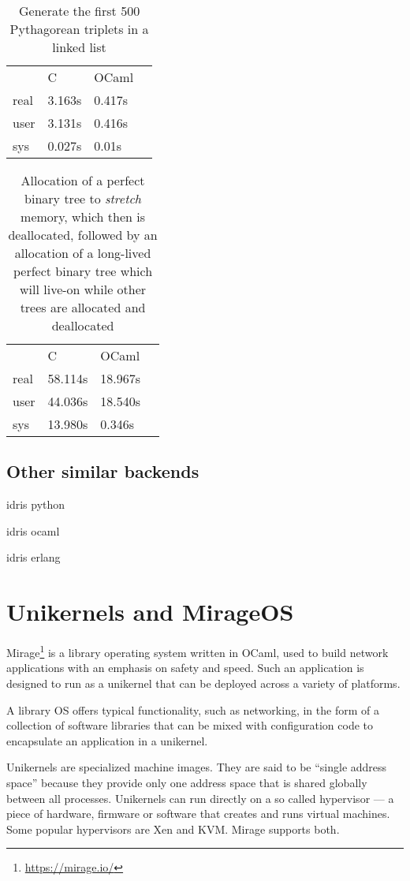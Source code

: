 \begin{table}
    \centering
    \caption{Generate the first 500 Pythagorean triplets in a linked list}
    \begin{tabular}{llll}\label{tab:pythagtab}
             & C      & OCaml  & \\
        real & 3.163s & 0.417s & \\
        user & 3.131s & 0.416s & \\
        sys  & 0.027s & 0.01s  &
    \end{tabular}
\end{table}


\begin{table}
    \centering
    \caption{Allocation of a perfect binary tree to \emph{stretch} memory, which then is deallocated, followed by an allocation of a long-lived perfect binary tree which will live-on while other trees are allocated and deallocated}
    \begin{tabular}{llll}\label{tab:bintreetab}
             & C       & OCaml   & \\
        real & 58.114s & 18.967s & \\
        user & 44.036s & 18.540s & \\
        sys  & 13.980s & 0.346s  &
    \end{tabular}
\end{table}

\subsection{Other similar backends}
idris python

idris ocaml

idris erlang


\section{Unikernels and MirageOS}\label{sec:mirage}
Mirage\footnote{\url{https://mirage.io/}} is a library operating system written in OCaml, used to build network
applications with an emphasis on safety and speed.
Such an application is designed to run as a unikernel that can be
deployed across a variety of platforms.

A library OS offers typical functionality, such as networking,
in the form of a collection of software libraries that can be
mixed with configuration code to encapsulate an application
in a unikernel.

Unikernels are specialized machine images.
They are said to be ``single address space'' because they provide
only one address space that is shared globally between all processes.
Unikernels can run directly on a so called hypervisor ---
a piece of hardware, firmware or software
that creates and runs virtual machines.
Some popular hypervisors are Xen and KVM. Mirage supports
both.

